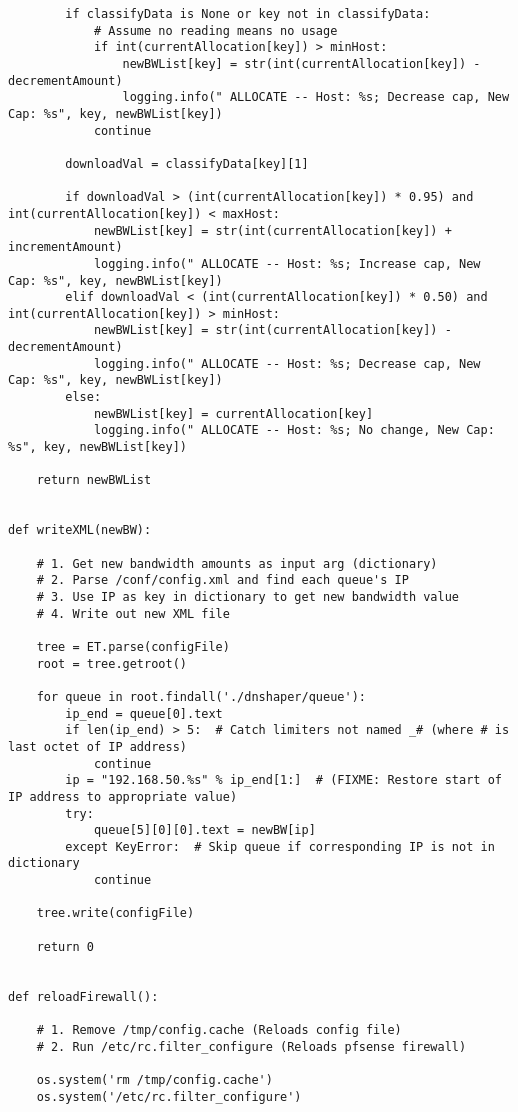 \begin{verbatim}
        if classifyData is None or key not in classifyData:
            # Assume no reading means no usage
            if int(currentAllocation[key]) > minHost:
                newBWList[key] = str(int(currentAllocation[key]) - decrementAmount)
                logging.info(" ALLOCATE -- Host: %s; Decrease cap, New Cap: %s", key, newBWList[key])
            continue

        downloadVal = classifyData[key][1]

        if downloadVal > (int(currentAllocation[key]) * 0.95) and int(currentAllocation[key]) < maxHost:
            newBWList[key] = str(int(currentAllocation[key]) + incrementAmount)
            logging.info(" ALLOCATE -- Host: %s; Increase cap, New Cap: %s", key, newBWList[key])
        elif downloadVal < (int(currentAllocation[key]) * 0.50) and int(currentAllocation[key]) > minHost:
            newBWList[key] = str(int(currentAllocation[key]) - decrementAmount)
            logging.info(" ALLOCATE -- Host: %s; Decrease cap, New Cap: %s", key, newBWList[key])
        else:
            newBWList[key] = currentAllocation[key]
            logging.info(" ALLOCATE -- Host: %s; No change, New Cap: %s", key, newBWList[key])

    return newBWList


def writeXML(newBW):

    # 1. Get new bandwidth amounts as input arg (dictionary)
    # 2. Parse /conf/config.xml and find each queue's IP
    # 3. Use IP as key in dictionary to get new bandwidth value
    # 4. Write out new XML file

    tree = ET.parse(configFile)
    root = tree.getroot()

    for queue in root.findall('./dnshaper/queue'):
        ip_end = queue[0].text
        if len(ip_end) > 5:  # Catch limiters not named _# (where # is last octet of IP address)
            continue
        ip = "192.168.50.%s" % ip_end[1:]  # (FIXME: Restore start of IP address to appropriate value)
        try:
            queue[5][0][0].text = newBW[ip]
        except KeyError:  # Skip queue if corresponding IP is not in dictionary
            continue

    tree.write(configFile)

    return 0


def reloadFirewall():

    # 1. Remove /tmp/config.cache (Reloads config file)
    # 2. Run /etc/rc.filter_configure (Reloads pfsense firewall)

    os.system('rm /tmp/config.cache')
    os.system('/etc/rc.filter_configure')


\end{verbatim}
